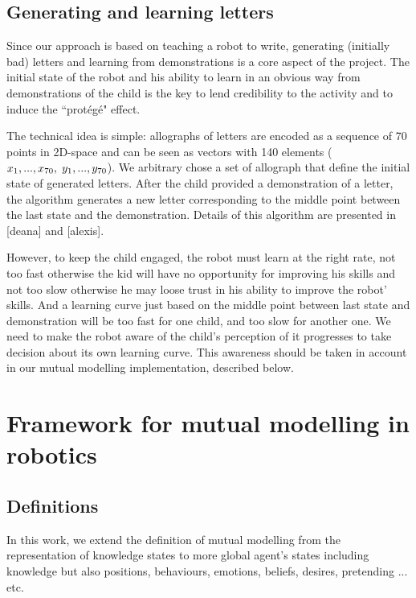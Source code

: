 \documentclass[10pt,a4paper,twocolumn]{article}
\begin{document}
\subsection{Generating and learning letters}

Since our approach is based on teaching a robot to write, generating (initially
bad) letters and learning from demonstrations is a core aspect of the project.
The initial state of the robot and his ability to learn in an obvious way
from demonstrations of the child is the key to lend credibility to the activity and to induce the ``prot\'eg\'e" effect.

The technical idea is simple: allographs of letters are encoded as a sequence of 70 points in
2D-space and can be seen as vectors with 140 elements
($x_1,...,x_{70},\hspace{1mm}y_1,...,y_{70}$). We arbitrary chose a set of allograph
that define the initial state of generated letters. 
After the child provided a demonstration of a letter, the algorithm
generates a new letter corresponding to the middle point between the last state and the
demonstration. Details of this algorithm are presented in [deana] and [alexis].

However, to keep the child engaged, the robot must learn at the right rate, not too fast otherwise the kid will have
no opportunity for improving his skills and not too slow otherwise he may loose
trust in his ability to improve the robot' skills. And a learning curve just based on the middle point between last state and demonstration will be too fast for one child, and too slow for another one. We need to make the robot aware of the child's perception of it progresses to take decision about its own learning curve. This awareness should be taken in account in our mutual modelling implementation, described below. 


\section{Framework for mutual modelling in robotics}

\subsection{Definitions}
In this work, we extend the definition of mutual modelling from the representation of knowledge states to more global agent's states including knowledge but also positions, behaviours, emotions, beliefs, desires, pretending ... etc. 
\end{document}
